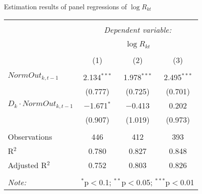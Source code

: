   \caption{Estimation results of panel regressions of $\log R_{kt}$} 
  \label{} 
\small 
\begin{tabular}{@{\extracolsep{5pt}}lccc} 
\\[-1.8ex]\hline 
\hline \\[-1.8ex] 
 & \multicolumn{3}{c}{\textit{Dependent variable:}} \\ 
\cline{2-4} 
\\[-1.8ex] & \multicolumn{3}{c}{$\log R_{kt}$} \\ 
\\[-1.8ex] & (1) & (2) & (3)\\ 
\hline \\[-1.8ex] 
 $NormOut_{k,t-1}$ & 2.134$^{***}$ & 1.978$^{***}$ & 2.495$^{***}$ \\ 
  & (0.777) & (0.725) & (0.701) \\ 
  
  $D_k\cdot NormOut_{k,t-1}$ & $-$1.671$^{*}$ & $-$0.413 & 0.202 \\ 
  & (0.907) & (1.019) & (0.973) \\ 
   
\hline \\[-1.8ex] 
Observations & 446 & 412 & 393 \\ 
R$^{2}$ & 0.780 & 0.827 & 0.848 \\ 
Adjusted R$^{2}$ & 0.752 & 0.803 & 0.826 \\ 
\hline 
\hline \\[-1.8ex] 
\textit{Note:}  & \multicolumn{3}{r}{$^{*}$p$<$0.1; $^{**}$p$<$0.05; $^{***}$p$<$0.01} \\ 
\end{tabular} 